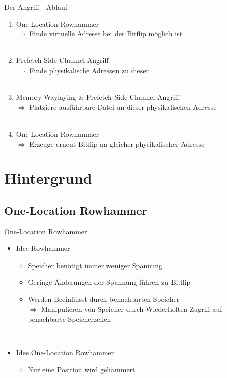\documentclass[german,10pt,xcolor=colortbl,compress
]{beamer}
\begin{document}
\begin{frame}{Der Angriff - Ablauf}

\begin{enumerate}
	\item One-Location Rowhammer\\
	$ \Rightarrow $ Finde virtuelle Adresse bei der Bitflip möglich ist\\~\\
	\pause
	\item Prefetch Side-Channel Angriff\\
	$ \Rightarrow $ Finde physikalische Adressen zu dieser\\~\\
	\pause
	\item Memory Waylaying \& Prefetch Side-Channel Angriff\\
	$ \Rightarrow $ Platziere ausführbare Datei an dieser physikalischen Adresse\\~\\
	\pause
	\item One-Location Rowhammer\\
	$ \Rightarrow $ Erzeuge erneut Bitflip an gleicher physikalischer Adresse
	
\end{enumerate}

\end{frame}


\section{Hintergrund}
\subsection{One-Location Rowhammer}
\begin{frame}{One-Location Rowhammer}
\begin{itemize}
\item Idee Rowhammer
	\begin{itemize}
	\item Speicher benötigt immer weniger Spannung
	\item Geringe Änderungen der Spannung führen zu Bitflip
	\item Werden Beeinflusst durch benachbarten Speicher
	\\$\Rightarrow$ Manipulieren von Speicher durch Wiederholten Zugriff auf benachbarte 	Speicherzellen
	\end{itemize}~\\
\item Idee One-Location Rowhammer
	\begin{itemize}
	\item Nur eine Position wird \glqq gehämmert\grqq
	\end{itemize}
\end{itemize}
\end{frame}
\end{document}
